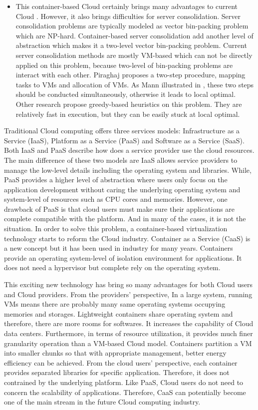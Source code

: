 \begin{itemize}
\item This container-based Cloud certainly brings many advantages to current Cloud \cite{Felter:2015wl}. However, it also brings difficulties for server consolidation. Server consolidation problems are typically modeled as vector bin-packing problem which are NP-hard. Container-based server consolidation add another level of abstraction which makes it a two-level vector bin-packing problem. Current server consolidation methods are mostly VM-based which can not be directly applied on this problem, because two-level of bin-packing problems are interact with each other. Piraghaj \cite{Piraghaj:2016tl} proposes a two-step procedure, mapping tasks to VMs and allocation of VMs. As Mann illustrated in \cite{Mann:2016hx},  these two steps should be conducted simultaneously, otherwise it leads to local optimal. Other research \cite{} propose greedy-based heuristics on this problem. They are relatively fast in execution, but they can be easily stuck at local optimal. 

\end{itemize}

Traditional Cloud computing offers three services models: Infrastructure as a Service (IaaS), Platform as a Service (PaaS) and Software as a Service (SaaS). Both IaaS and PaaS describe how does a service provider use the cloud resources. The main difference of these two models are  
IaaS allows service providers to manage the low-level details including the operating system and libraries. While, PaaS provides a higher level of abstraction where users only focus on the application development without caring the underlying operating system and system-level of resources such as CPU cores and memories. However, one drawback of PaaS is that cloud users must make sure their applications are complete compatible with the platform. And in many of the cases, it is not the situation. In order to solve this problem, a container-based virtualization technology starts to reform the Cloud industry. Container as a Service (CaaS) 
is a new concept but it has been used in industry for many years. Containers provide an operating system-level of isolation environment for applications. It does not need a hypervisor but complete rely on the operating system. 


This exciting new technology has bring so many advantages for both Cloud users and Cloud providers. From the providers' perspective, In a large system, running VMs means there are probably many same operating systems occupying memories and storages. Lightweight containers share operating system and therefore, there are more rooms for softwares. It increases the capability of Cloud data centers. Furthermore, in terms of resource utilization, it provides much finer granularity operation than a VM-based Cloud model. Containers partition
a VM into smaller chunks so that with appropriate management, better energy efficiency can be achieved. From the cloud users' perspective, each container provides separated libraries for specific application.  Therefore, it does not contrained by the underlying platform. Like PaaS, Cloud users do not need to concern the scalability of applications. 
Therefore, CaaS can potentially become one of the main stream in the future Cloud computing industry. 

